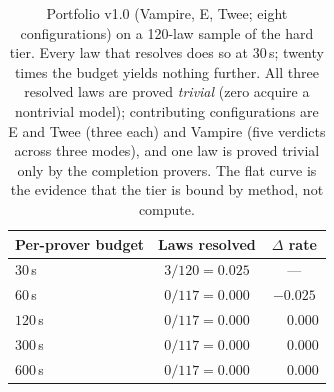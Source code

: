 \begin{table}[t]
\centering
\small
\begin{tabular}{lcc}
\toprule
Per-prover budget & Laws resolved & $\Delta$ rate \\
\midrule
$30$\,s  & $3/120 = 0.025$ & --- \\
$60$\,s  & $0/117 = 0.000$ & $-0.025$ \\
$120$\,s & $0/117 = 0.000$ & $\phantom{-}0.000$ \\
$300$\,s & $0/117 = 0.000$ & $\phantom{-}0.000$ \\
$600$\,s & $0/117 = 0.000$ & $\phantom{-}0.000$ \\
\bottomrule
\end{tabular}
\caption{Portfolio v1.0 (Vampire, E, Twee; eight configurations) on a 120-law
sample of the hard tier. Every law that resolves does so at $30$\,s; twenty times the
budget yields nothing further. All three resolved laws are proved \emph{trivial}
(zero acquire a nontrivial model); contributing configurations are E and Twee (three
each) and Vampire (five verdicts across three modes), and one law is proved trivial
only by the completion provers. The flat curve is the evidence that the tier is bound
by method, not compute.}
\label{tab:baseline}
\end{table}


